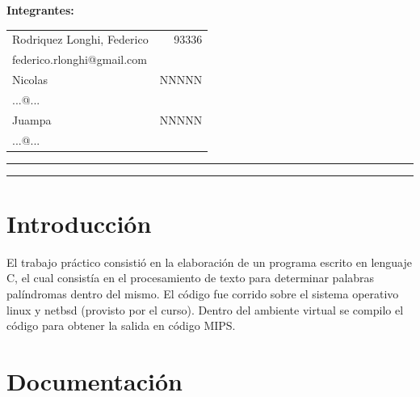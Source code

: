\documentclass[11pt,a4paper]{article}
\newcommand\blankpage{%
	\null
	\thispagestyle{empty}%
	\addtocounter{page}{-1}%
	\newpage}
\begin{document}
\begin{titlepage}
	\begin{flushleft}
	\begin{table}[H]
		\begin{flushleft}
		\textbf{Integrantes:}\\
		\vspace{0.01\textheight}
		\begin{tabular}{l r}
			Rodriquez Longhi, Federico  & 93336\\
			\hspace{0.05\textheight}federico.rlonghi@gmail.com&\\
			Nicolas  & NNNNN\\
			\hspace{0.05\textheight}...@...&\\
			Juampa & NNNNN\\
			\hspace{0.05\textheight}...@...&\\
		\end{tabular}
		\end{flushleft}
	\end{table}
		

	\end{flushleft}
	\vspace{0.05\textheight}
	\vspace{2pt}
	\vfill
	\rule{\textwidth}{1pt}\par %
	\vspace{2pt}\vspace{-\baselineskip} %
	\rule{\textwidth}{0.4pt}\par %
	
\end{titlepage}

\blankpage

\tableofcontents

\newpage

\section{Introducción}
El trabajo práctico consistió en la elaboración de un programa escrito en lenguaje C, el cual consistía en el procesamiento de texto para determinar palabras palíndromas dentro del mismo.
El código fue corrido sobre el sistema operativo linux y netbsd (provisto por el curso). Dentro del ambiente virtual se compilo el código para obtener la salida en código MIPS.

\section{Documentación}
\end{document}
